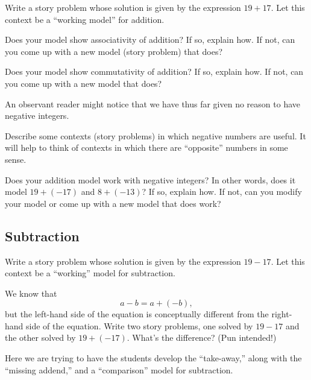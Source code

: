\begin{question}
Write a story problem whose solution is given by the expression
$19+17$. Let this context be a ``working model'' for addition.
\end{question}
\QM

\begin{question}
Does your model show associativity of addition? If so, explain how. If
not, can you come up with a new model (story problem) that does?
\end{question}
\QM

\begin{question}
Does your model show commutativity of addition? If so, explain how. If
not, can you come up with a new model that does?
\end{question}
\QM

An observant reader might notice that we have thus far given no reason to have 
negative integers.  

\begin{question}
Describe some contexts (story problems) in which negative numbers are useful.  
It will help to think of contexts in which there are ``opposite'' numbers in some sense.  
\end{question}
\QM

\begin{question}
Does your addition model work with negative integers?  In other words, does it model 
$19+ (-17)$ and $8 + (-13)$?  If so, explain how. If not, can you modify your model or 
come up with a new model that does work?
\end{question}
\QM

\subsection{Subtraction}
\begin{question}
Write a story problem whose solution is given by the expression
$19-17$. Let this context be a ``working'' model for subtraction.  
\end{question}
\QM

\begin{question}
We know that 
\[
a - b  = a + (-b),
\]
but the left-hand side of the equation is conceptually
different from the right-hand side of the equation. Write two story
problems, one solved by $19-17$ and the other solved by
$19+(-17)$. What's the difference? (Pun intended!)
\end{question}
\QM

\begin{teachingnote}
Here we are trying to have the students develop the ``take-away,''
along with the ``missing addend,'' and a ``comparison'' model for
subtraction.
\end{teachingnote}


